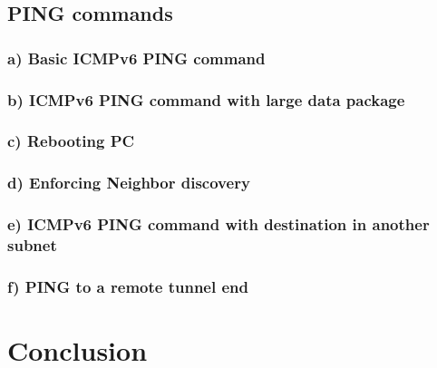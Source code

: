 \section{PING commands}
\subsection{a) Basic ICMPv6 PING command}
\subsection{b) ICMPv6 PING command with large data package}
\subsection{c) Rebooting PC}
\subsection{d) Enforcing Neighbor discovery}
\subsection{e) ICMPv6 PING command with destination in another subnet}
\subsection{f) PING to a remote tunnel end}

\chapter{Conclusion}
\label{conclusion}